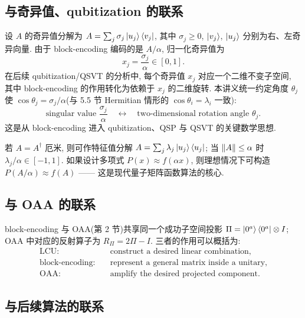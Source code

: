 \documentclass[utf8]{article} %
\numberwithin{equation}{section}   %
\begin{document}
\subsection{与奇异值、qubitization 的联系}

设 $A$ 的奇异值分解为 $A = \sum_j \sigma_j \ket{u_j}\bra{v_j}$, 其中 $\sigma_j \ge 0$,
$\ket{v_j}$, $\ket{u_j}$ 分别为右、左奇异向量. 由于 block-encoding 编码的是 $A/\alpha$,
归一化奇异值为
\begin{equation}
    x_j = \frac{\sigma_j}{\alpha} \in [0, 1].
\end{equation}
在后续 qubitization/QSVT 的分析中, 每个奇异值 $x_j$ 对应一个二维不变子空间, 其中
block-encoding 的作用转化为依赖于 $x_j$ 的二维旋转. 本讲义统一约定角度 $\theta_j$ 使
$\cos\theta_j = \sigma_j/\alpha$(与 5.5 节 Hermitian 情形的 $\cos\theta_i = \lambda_i$ 一致):
\begin{equation}
    \text{singular value } \frac{\sigma_j}{\alpha}
    \quad\longleftrightarrow\quad
    \text{two-dimensional rotation angle } \theta_j.
\end{equation}
这是从 block-encoding 进入 qubitization、QSP 与 QSVT 的关键数学思想.

若 $A = A^\dagger$ 厄米, 则可作特征值分解 $A = \sum_j \lambda_j \ket{u_j}\bra{u_j}$; 当
$\norm{A} \le \alpha$ 时 $\lambda_j/\alpha \in [-1,1]$. 如果设计多项式
$P(x) \approx f(\alpha x)$, 则理想情况下可构造 $P(A/\alpha) \approx f(A)$ ——
这是现代量子矩阵函数算法的核心.

\subsection{与 OAA 的联系}

block-encoding 与 OAA(第 2 节)共享同一个成功子空间投影 $\Pi = \ket{0^a}\bra{0^a}\otimes I$;
OAA 中对应的反射算子为 $R_\Pi = 2\Pi - I$. 三者的作用可以概括为:
\begin{equation}
    \begin{aligned}
        \text{LCU}: &\quad \text{construct a desired linear combination},\\
        \text{block-encoding}: &\quad \text{represent a general matrix inside a unitary},\\
        \text{OAA}: &\quad \text{amplify the desired projected component}.
    \end{aligned}
\end{equation}

\subsection{与后续算法的联系}
\end{document}
